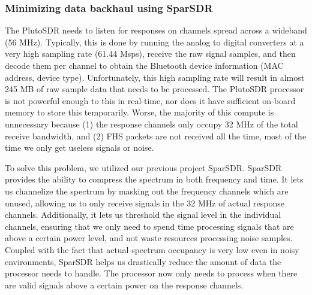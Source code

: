
\subsubsection{Minimizing data backhaul using SparSDR}
The PlutoSDR needs to listen for responses on channels spread across a wideband (56 MHz). 
%
Typically, this is done by running the analog to digital converters at a very high sampling rate (61.44 Msps), receive the raw signal samples, and then decode them per channel to obtain the Bluetooth device information (MAC address, device type).
%
Unfortunately, this high sampling rate will result in almost 245 MB of raw sample data that needs to be processed. 
%
The PlutoSDR processor is not powerful enough to this in real-time, nor does it have sufficient on-board memory to store this temporarily.
%
Worse, the majority of this compute is unnecessary because (1) the response channels only occupy 32 MHz of the total receive bandwidth, and (2) FHS packets are not received all the time, most of the time we only get useless signals or noise. 
%

To solve this problem, we utilized our previous project SparSDR. SparSDR provides the ability to compress the spectrum in both frequency and time. 
%
It lets us channelize the spectrum by masking out the frequency channels which are unused, allowing us to only receive signals in the 32 MHz of actual response channels. 
%
Additionally, it lets us threshold the signal level in the individual channels, ensuring that we only need to spend time processing signals that are above a certain power level, and not waste resources processing noise samples.
%
Coupled with the fact that actual spectrum occupancy is very low  even in noisy environments, SparSDR helps us drastically reduce the amount of data the processor needs to handle.
%
The processor now only needs to process when there are valid signals above a certain power on the response channels.